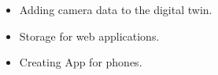 \begin{itemize}
    \item Adding camera data to the digital twin.
    \item Storage for web applications.
    \item Creating App for phones.
\end{itemize}